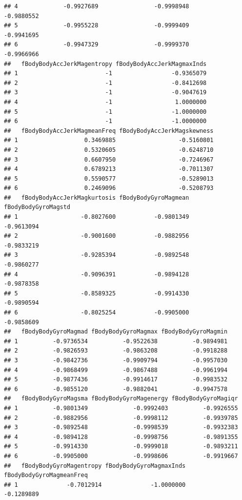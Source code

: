 \documentclass[
]{article}
\begin{document}
\begin{verbatim}
## 4             -0.9927689                -0.9998948             -0.9880552
## 5             -0.9955228                -0.9999409             -0.9941695
## 6             -0.9947329                -0.9999370             -0.9966966
##   fBodyBodyAccJerkMagentropy fBodyBodyAccJerkMagmaxInds
## 1                         -1                 -0.9365079
## 2                         -1                 -0.8412698
## 3                         -1                 -0.9047619
## 4                         -1                  1.0000000
## 5                         -1                 -1.0000000
## 6                         -1                 -1.0000000
##   fBodyBodyAccJerkMagmeanFreq fBodyBodyAccJerkMagskewness
## 1                   0.3469885                  -0.5160801
## 2                   0.5320605                  -0.6248710
## 3                   0.6607950                  -0.7246967
## 4                   0.6789213                  -0.7011307
## 5                   0.5590577                  -0.5289013
## 6                   0.2469096                  -0.5208793
##   fBodyBodyAccJerkMagkurtosis fBodyBodyGyroMagmean fBodyBodyGyroMagstd
## 1                  -0.8027600           -0.9801349          -0.9613094
## 2                  -0.9001600           -0.9882956          -0.9833219
## 3                  -0.9285394           -0.9892548          -0.9860277
## 4                  -0.9096391           -0.9894128          -0.9878358
## 5                  -0.8589325           -0.9914330          -0.9890594
## 6                  -0.8025254           -0.9905000          -0.9858609
##   fBodyBodyGyroMagmad fBodyBodyGyroMagmax fBodyBodyGyroMagmin
## 1          -0.9736534          -0.9522638          -0.9894981
## 2          -0.9826593          -0.9863208          -0.9918288
## 3          -0.9842736          -0.9909794          -0.9957030
## 4          -0.9868499          -0.9867488          -0.9961994
## 5          -0.9877436          -0.9914617          -0.9983532
## 6          -0.9855120          -0.9882041          -0.9947578
##   fBodyBodyGyroMagsma fBodyBodyGyroMagenergy fBodyBodyGyroMagiqr
## 1          -0.9801349             -0.9992403          -0.9926555
## 2          -0.9882956             -0.9998112          -0.9939785
## 3          -0.9892548             -0.9998539          -0.9932383
## 4          -0.9894128             -0.9998756          -0.9891355
## 5          -0.9914330             -0.9999018          -0.9893211
## 6          -0.9905000             -0.9998606          -0.9919667
##   fBodyBodyGyroMagentropy fBodyBodyGyroMagmaxInds fBodyBodyGyroMagmeanFreq
## 1              -0.7012914              -1.0000000               -0.1289889

\end{verbatim}
\end{document}
